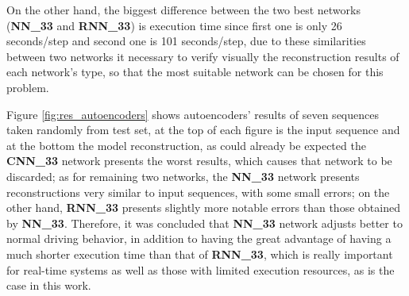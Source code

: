 On the other hand, the biggest difference between the two best networks (\textbf{NN\_33} and \textbf{RNN\_33}) is execution time since first one is only 26 seconds/step and second one is 101 seconds/step, due to these similarities between two networks it necessary to verify visually the reconstruction results of each network's type, so that the most suitable network can be chosen for this problem.

\vspace{5mm} %

Figure \ref{fig:res_autoencoders} shows autoencoders' results of seven sequences taken randomly from test set, at the top of each figure is the input sequence and at the bottom the model reconstruction, as could already be expected the \textbf{CNN\_33} network presents the worst results, which causes that network to be discarded; as for remaining two networks, the \textbf{NN\_33} network presents reconstructions very similar to input sequences, with some small errors; on the other hand, \textbf{RNN\_33} presents slightly more notable errors than those obtained by \textbf{NN\_33}. Therefore, it was concluded that \textbf{NN\_33} network adjusts better to normal driving behavior, in addition to having the great advantage of having a much shorter execution time than that of \textbf{RNN\_33}, which is really important for real-time systems as well as those with limited execution resources, as is the case in this work.

